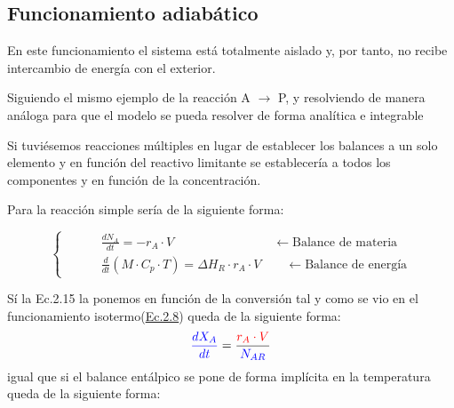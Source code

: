 \subsection{Funcionamiento adiabático}
En este funcionamiento el sistema está totalmente aislado y, por tanto, no recibe intercambio de energía con el exterior.

Siguiendo el mismo ejemplo de la reacción A $\rightarrow$ P, y resolviendo de manera análoga para que el modelo se pueda resolver de forma analítica e integrable

Si tuviésemos reacciones múltiples en lugar de establecer los balances a un solo elemento y en función del reactivo limitante se establecería a todos los componentes y en función de la concentración.

Para la reacción simple sería de la siguiente forma:

\begin{equation}
    \left\{
    \begin{aligned}
         & \hspace{2em}\frac{dN_A}{dt}                   = -r_A \cdot V       \hspace{8em}\leftarrow \text{Balance de materia}           \\
         & \hspace{2em}\frac{d}{dt}(M\cdot C_p \cdot T)  = \Delta H_R \cdot r_A \cdot V \hspace{2em}\leftarrow \text{Balance de energía}
    \end{aligned}
    \right.
\end{equation}

Sí la Ec.2.15 la ponemos en función de la conversión tal y como se vio en el funcionamiento isotermo(\hyperlink{Ec2.8}{Ec.2.8}) queda de la siguiente forma:
\begin{equation}
    \textcolor{blue}{\frac{dX_A}{dt}} = \frac{\textcolor{red}{r_A \cdot V}}{\textcolor{blue}{N_{AR}}}
\end{equation}
igual que si el balance entálpico se pone de forma implícita en la temperatura queda de la siguiente forma:

